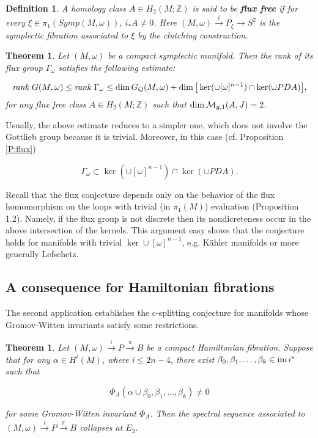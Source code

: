 \documentclass[a4paper,14pt]{article}
\newcommand{\B}[1]{\mathbb #1}
\newcommand{\C}[1]{{\cal #1}}
\newcommand{\al}{{\alpha}}
\newcommand{\be}{{\beta}}
\newcommand{\om}{{\omega}}
\newcommand{\Ga}{{\Gamma}}
\newcommand{\map}[1]{\stackrel {#1}\longrightarrow}
\newcommand{\Mo}{(M,\omega )}
\newcommand{\pis}{\pi _1(Symp\Mo )}
\newcommand{\im}{\text {im \!}}
\newcommand{\rank}{{\hbox {\em rank }}}
\newcommand{\sfib}{\Mo \map{i} P\map{\pi } B}
\newcommand{\BS}{{\bigskip}}
\newcommand{\NI}{{\noindent}}
\newtheorem{thm}[theorem]{Theorem}
\newtheorem{defin}[theorem]{Definition}
\numberwithin{equation}{section}
\begin{document}
\begin{defin}\label{D:fluxfree}
A homology class $A\in H_2(M;\B Z)$ is said to be
{\bf flux free} if for every $\xi \in \pis $,
$i_*A\neq 0$. Here $\Mo \map{i}P_{\xi }\to S^2$ is the 
symplectic fibration
associated to $\xi $ by the clutching construction.
\end{defin}


\begin{thm}\label{T:rank}
Let $\Mo $ be a compact symplectic manifold. 
Then the
rank of its flux group $\Ga _{\om }$ satisfies the following
estimate:

$$\rank G\Mo \leq \rank \Ga _{\om }\leq \dim G_{Q}\Mo + 
\dim \big 
[\ker (\cup [\om ]^{n-1}) \cap \ker (\cup  PDA)
\big ],$$
for any flux free class $A\in H_2(M;\B Z)$ such that
$\dim \C M_{g,1}(A,J)=2$. 
\end{thm}



Usually, the above estimate
reduces to a simpler one, which does not involve the
Gottlieb group because it is trivial. 
Moreover, in this case (cf. Proposition \ref{P:flux})

$$
\Ga _{\om }\subset  
\ker (\cup [\om ]^{n-1}) \cap \ker (\cup PDA )
.$$

\NI
Recall that the flux conjecture depends only on the behavior
of the flux homomorphism on the loops with trivial 
(in $\pi_1(M)$) evaluation \cite{lmp1} (Proposition 1.2).
Namely, if the flux group is not discrete then 
its nondicreteness occur in the above intersection of
the kernels. This argument easy shows that the conjecture
holds for manifolds with trivial $\ker \cup [\om ]^{n-1}$,
e.g. K\"ahler manifolds or more generally Lefschetz.





\BS


\subsection{A consequence for Hamiltonian fibrations}


The second application establishes the c-splitting conjecture
for manifolds whose Gromov-Witten invariants satisfy some
restrictions. 


\begin{thm}\label{T:ham}
Let $\sfib $ be a compact Hamiltonian fibration. 
Suppose that for any
$\al \in H^i(M)$, where $i \leq 2n -4$,
there exist $\be _0,\be _1,\dots ,\be_k \in \im i^*$  such
that 

$$\Phi _A(\al \cup \be_0,\be_1,\dots,\be_k)\neq 0$$

\NI
for some Gromov-Witten invariant $\Phi _A $.
Then the spectral sequence associated 
to $\sfib $ collapses at $E_2$.
\end{thm}
\end{document}
